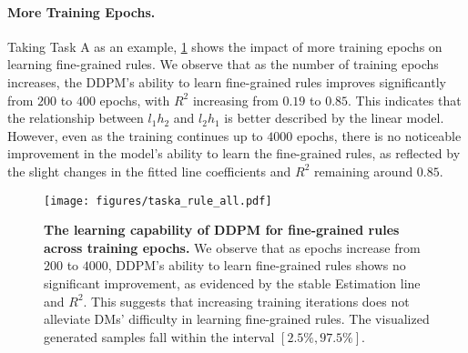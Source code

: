 \paragraph{More Training Epochs.}Taking Task A as an example, \cref{fig:taska_rule_all} shows the impact of more training epochs on learning fine-grained rules. We observe that as the number of training epochs increases, the DDPM's ability to learn fine-grained rules improves significantly from $200$ to $400$ epochs, with $R^2$ increasing from $0.19$ to $0.85$. This indicates that the relationship between $l_1h_2$ and $l_2h_1$ is better described by the linear model. However, even as the training continues up to $4000$ epochs, there is no noticeable improvement in the model’s ability to learn the fine-grained rules, as reflected by the slight changes in the fitted line coefficients and $R^2$ remaining around $0.85$.
\begin{figure}[]
  \centering  \texttt{[image: figures/taska\_rule\_all.pdf]}
  \vspace*{-5mm}
  \caption{\textbf{The learning capability of DDPM for fine-grained rules across training epochs.} We observe that as epochs increase from $200$ to $4000$, DDPM's ability to learn fine-grained rules shows no significant improvement, as evidenced by the stable Estimation line and $R^2$. This suggests that increasing training iterations does not alleviate DMs' difficulty in learning fine-grained rules.  The visualized generated samples fall within the interval $[2.5\%, 97.5\%]$.}
  \label{fig:taska_rule_all}
\end{figure}
